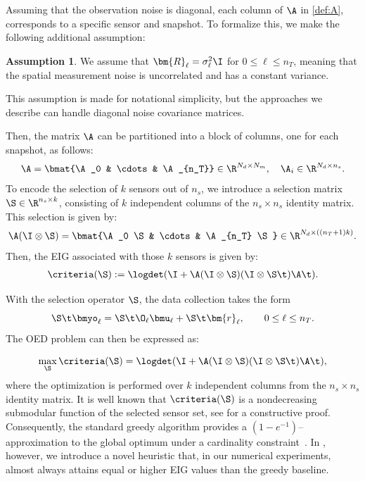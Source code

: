 \documentclass{aims} %
\theoremstyle{definition}
\newtheorem{assumption}{Assumption}
\begin{document}
Assuming that the observation noise is diagonal, 
 each column of  $\A$ in  \eqref{def:A},  corresponds to a specific sensor and snapshot. 
To formalize this, we make the following additional assumption:
\begin{assumption}\label{assumption:diag_R} 
We assume that $\bm{R}_\ell = \sigma_\ell^2 \I$ for $0 \le \ell \le n_T$,  meaning that the spatial measurement noise is uncorrelated and has a constant variance.
\end{assumption}
This assumption is made for notational simplicity, but the approaches we describe can handle diagonal noise covariance matrices. 


%
Then, the  matrix \(\A\) can be partitioned into a block of columns, one for each snapshot, as follows:
\begin{align} \label{eq:partitionA}
\A = \bmat{\A_0 & \cdots & \A_{n_T}}\in \R^{N_d \times N_m}, \quad  \A_i \in \R^{N_d\times n_s}.
\end{align}
To encode the selection of \(k\) sensors out of \(n_s\), we introduce a selection matrix \(\S \in \R^{n_s \times k}\), consisting of \(k\) independent columns of the \(n_s \times n_s\) identity matrix. This selection is given by:
\[
\A (\I \otimes \S) = \bmat{\A_0 \S & \cdots & \A_{n_T} \S}\in \R^{N_d \times ((n_T+1)k)}.
\]
Then, the EIG associated with those $k$ sensors is given by:
\begin{align}\label{def:EIG_S}
\criteria(\S) := \logdet( \I + \A (\I \otimes \S) (\I \otimes \S\t)\A\t).
\end{align} 



With the selection operator $\S$, the data collection takes the form
\[ \S\t\bmyo_{\ell} = \S\t\O_\ell\bmu_\ell + \S\t\bm{r}_{\ell}, \qquad 0 \le \ell \le n_T.\] 
The OED problem can then be expressed as:

\[ \max_{\S} \criteria(\S) = \logdet( \I + \A (\I \otimes \S) (\I \otimes \S\t)\A\t),\]
where the optimization is performed over $k$ independent columns from the $n_s\times n_s$ identity matrix. 
%
It is well known that $\criteria(\S)$ is a nondecreasing submodular function of the selected sensor set, see \cite{maio2025submodularity} for a constructive proof. Consequently, the standard greedy algorithm provides a $(1 - e^{-1})$–approximation to the global optimum under a cardinality constraint~\cite{nemhauser}. In , however, we introduce a novel heuristic that, in our numerical experiments, almost always attains equal or higher EIG values than the greedy baseline.
\end{document}
